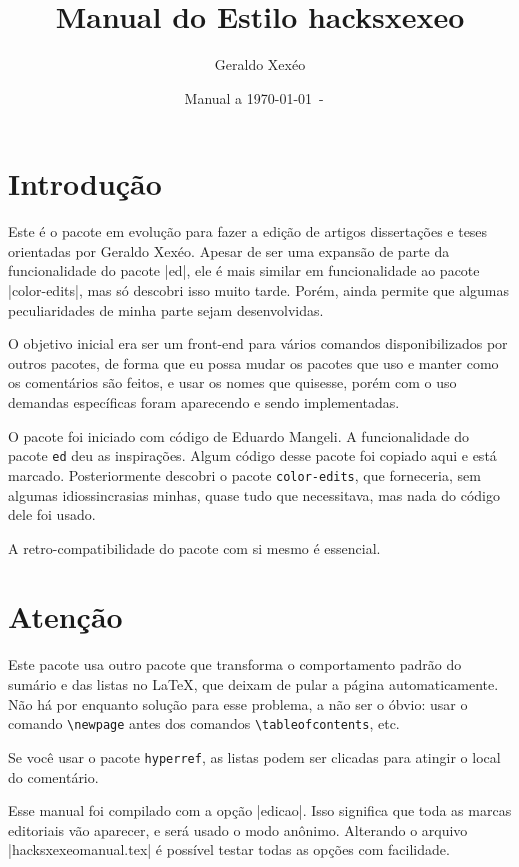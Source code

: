 \documentclass{article}
\title{Manual do Estilo hacksxexeo \hacksxexeoversion}
\author{Geraldo Xexéo}
\date{Manual \hacksxexeoversion a \today\ - \ \currenttime}
\begin{document}
    
    \maketitle
    
    \tableofcontents
    
    \section{Introdução}
    
    Este é o  pacote em evolução para fazer a edição de artigos dissertações e teses orientadas por Geraldo Xexéo. Apesar de ser uma expansão de parte da funcionalidade do pacote |ed|, ele é mais similar em funcionalidade ao pacote |color-edits|, mas só descobri isso muito tarde. Porém, ainda permite que algumas peculiaridades de minha parte sejam desenvolvidas.
    
    O objetivo inicial era ser um front-end para vários comandos disponibilizados por outros pacotes, de forma que eu possa mudar os pacotes que uso e manter como os comentários são feitos, e usar os nomes que quisesse, porém com o uso demandas específicas foram aparecendo e sendo implementadas.
    
    O pacote foi iniciado com código de Eduardo Mangeli. A funcionalidade do pacote \verb|ed| deu as inspirações. Algum código desse pacote foi copiado aqui e está marcado. Posteriormente descobri o pacote \verb|color-edits|, que forneceria, sem algumas idiossincrasias minhas, quase tudo que necessitava, mas nada do código dele foi usado.
    
    A retro-compatibilidade do pacote com si mesmo é essencial.
    
    \section{Atenção}
    
    Este pacote usa outro pacote que transforma o comportamento padrão do sumário e das listas no \LaTeX, que deixam de pular a página automaticamente. Não há por enquanto solução para esse problema, a não ser o óbvio: usar o comando \verb!\newpage! antes dos comandos \verb!\tableofcontents!, etc.
    
    Se você usar o pacote \verb!hyperref!, as listas podem ser clicadas para atingir o local do comentário.
    
    Esse manual foi compilado com a opção |edicao|. Isso significa que toda as marcas editoriais vão aparecer, e será usado o modo anônimo. Alterando o arquivo |hacksxexeomanual.tex| é possível testar todas as opções com facilidade.
    
\end{document}
